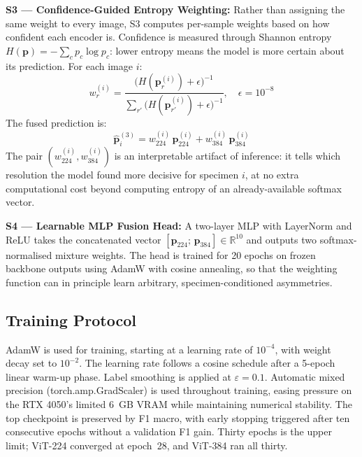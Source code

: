 \documentclass[conference]{IEEEtran}
\begin{document}
\textbf{S3 --- Confidence-Guided Entropy Weighting:} Rather than assigning
the same weight to every image, S3 computes per-sample weights based on how
confident each encoder is. Confidence is measured through Shannon entropy
$H(\mathbf{p}) = -\sum_{c} p_c \log p_c$: lower entropy means the model is
more certain about its prediction. For each image $i$:
\begin{equation}
  w_{r}^{(i)} = \frac{\bigl(H(\mathbf{p}_{r}^{(i)}) + \epsilon\bigr)^{-1}}
                     {\sum_{r'}\bigl(H(\mathbf{p}_{r'}^{(i)}) + \epsilon\bigr)^{-1}},
                \quad \epsilon = 10^{-8}
\end{equation}
The fused prediction is:
\begin{equation}
  \hat{\mathbf{p}}^{(3)}_i = w_{224}^{(i)}\,\mathbf{p}_{224}^{(i)}
                              + w_{384}^{(i)}\,\mathbf{p}_{384}^{(i)}
\end{equation}
The pair $(w_{224}^{(i)}, w_{384}^{(i)})$ is an interpretable artifact of
inference: it tells which resolution the model found more decisive for
specimen $i$, at no extra computational cost beyond computing entropy of an
already-available softmax vector.

\textbf{S4 --- Learnable MLP Fusion Head:} A two-layer MLP with LayerNorm
and ReLU takes the concatenated vector $[\mathbf{p}_{224};\,\mathbf{p}_{384}]
\in \mathbb{R}^{10}$ and outputs two softmax-normalised mixture weights. The
head is trained for 20 epochs on frozen backbone outputs using AdamW with
cosine annealing, so that the weighting function can in principle learn
arbitrary, specimen-conditioned asymmetries.

\subsection{Training Protocol}

AdamW is used for training, starting at a learning rate of $10^{-4}$, with
weight decay set to $10^{-2}$. The learning rate follows a cosine schedule
after a 5-epoch linear warm-up phase. Label smoothing \cite{szegedy2016} is
applied at $\varepsilon = 0.1$. Automatic mixed precision
(torch.amp.GradScaler) is used throughout training, easing pressure on the
RTX 4050's limited 6~GB VRAM while maintaining numerical stability. The top
checkpoint is preserved by F1 macro, with early stopping triggered after ten
consecutive epochs without a validation F1 gain. Thirty epochs is the upper
limit; ViT-224 converged at epoch~28, and ViT-384 ran all thirty.
\end{document}
